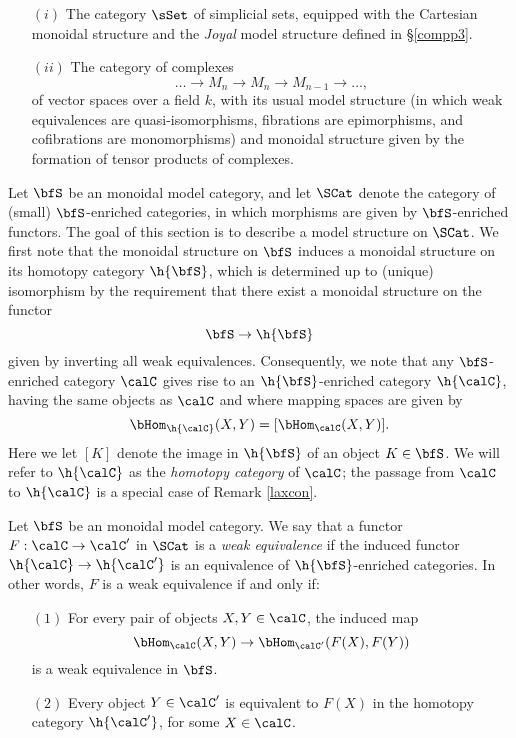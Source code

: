 \begin{Simplicial Categories}
\begin{itemize}
\item[$(i)$] The category $\sSet$ of simplicial sets, equipped with the Cartesian monoidal structure and the {\em Joyal} model structure defined in \S \ref{compp3}.
\item[$(ii)$] The category of complexes
$$ \ldots \rightarrow M_{n} \rightarrow M_{n} \rightarrow M_{n-1} \rightarrow \ldots, $$
of vector spaces over a field $k$, with its usual model structure (in which weak equivalences are quasi-isomorphisms, fibrations are epimorphisms, and cofibrations are monomorphisms) and monoidal structure given by the formation of tensor products of complexes.
\end{itemize}

Let $\bfS$ be an monoidal model category, and let $\SCat$ denote the category of (small) $\bfS$-enriched categories, in which morphisms are
given by $\bfS$-enriched functors. The goal of this section is to describe a model structure on $\SCat$. 
We first note that the monoidal structure on $\bfS$ induces a monoidal structure on its
homotopy category $\h{\bfS}$, which is determined up to (unique) isomorphism by the requirement that there exist a monoidal structure on the functor
$$ \bfS \rightarrow \h{\bfS} $$
given by inverting all weak equivalences. Consequently, 
we note that any $\bfS$-enriched category $\calC$ gives rise to an $\h{\bfS}$-enriched category $\h{\calC}$, having the same objects as $\calC$ and where mapping spaces are given by
$$ \bHom_{\h{\calC}}(X,Y) = [ \bHom_{\calC}(X,Y) ].$$
Here we let $[K]$ denote the image in $\h{\bfS}$ of an object $K \in \bfS$. We will refer to
$\h{\calC}$ as the {\it homotopy category} of $\calC$; the passage from
$\calC$ to $\h{\calC}$ is a special case of Remark \ref{laxcon}.

\begin{definition}\label{equivdefequiv}
Let $\bfS$ be an monoidal model category.
We say that a functor $F: \calC \rightarrow \calC'$ in $\SCat$ is a {\it weak equivalence}
if the induced functor $\h{\calC} \rightarrow \h{\calC'}$ is an equivalence of $\h{\bfS}$-enriched categories. In other words, $F$ is a weak equivalence if and only if:

\begin{itemize}
\item[$(1)$] For every pair of objects $X,Y \in \calC$, the induced map
$$ \bHom_{\calC}(X,Y) \rightarrow \bHom_{\calC'}(F(X),F(Y))$$ is a weak equivalence in $\bfS$.
\item[$(2)$] Every object $Y \in \calC'$ is equivalent to $F(X)$ in the homotopy category $\h{\calC'}$, for some $X \in \calC$.
\end{itemize}
\end{definition}


\end{Simplicial Categories}
